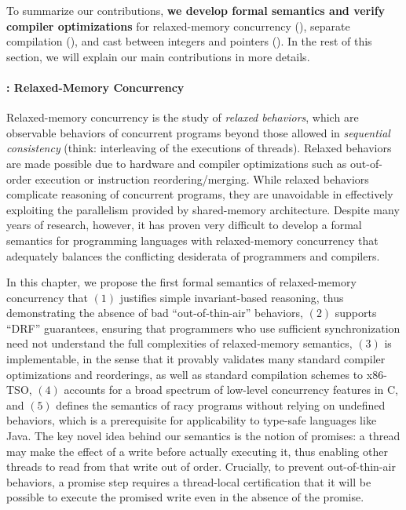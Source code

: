 To summarize our contributions, \textbf{we develop formal semantics and verify compiler
  optimizations} for relaxed-memory concurrency (), separate compilation
(), and cast between integers and pointers ().  In the rest
of this section, we will explain our main contributions in more details.


\paragraph{: Relaxed-Memory Concurrency}

Relaxed-memory concurrency is the study of \emph{relaxed behaviors}, which are observable behaviors
of concurrent programs beyond those allowed in \emph{sequential consistency} (think: interleaving of
the executions of threads).  Relaxed behaviors are made possible due to hardware and compiler
optimizations such as out-of-order execution or instruction reordering/merging.  While relaxed
behaviors complicate reasoning of concurrent programs, they are unavoidable in effectively
exploiting the parallelism provided by shared-memory architecture.  Despite many years of research,
however, it has proven very difficult to develop a formal semantics for programming languages with
relaxed-memory concurrency that adequately balances the conflicting desiderata of programmers and
compilers.

In this chapter, we propose the first formal semantics of relaxed-memory concurrency that $(1)$
justifies simple invariant-based reasoning, thus demonstrating the absence of bad
``out-of-thin-air'' behaviors, $(2)$ supports ``DRF'' guarantees, ensuring that programmers who use
sufficient synchronization need not understand the full complexities of relaxed-memory semantics,
$(3)$ is implementable, in the sense that it provably validates many standard compiler optimizations
and reorderings, as well as standard compilation schemes to x86-TSO, $(4)$ accounts for a broad
spectrum of low-level concurrency features in C, and $(5)$ defines the semantics of racy programs
without relying on undefined behaviors, which is a prerequisite for applicability to type-safe
languages like Java.  The key novel idea behind our semantics is the notion of promises: a thread
may make the effect of a write before actually executing it, thus enabling other threads to read
from that write out of order.  Crucially, to prevent out-of-thin-air behaviors, a promise step
requires a thread-local certification that it will be possible to execute the promised write even in
the absence of the promise.

